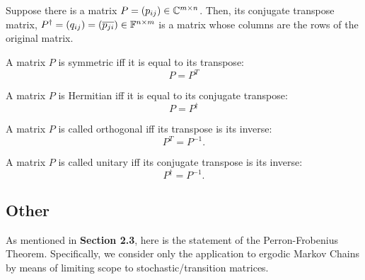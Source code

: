 \begin{definition}
Suppose there is a matrix $P = (p_{ij}) \in \mathbb{C}^{m\times n}$. Then, its conjugate transpose matrix, $P^{\dagger} = (q_{ij}) = (\overline{p_{ji}}) \in \mathbb{F}^{n\times m}$ is a matrix whose columns are the rows of the original matrix.
\end{definition}

\begin{definition}
A matrix $P$ is symmetric iff it is equal to its transpose:
$$ P = P^{T}$$
\end{definition}

\begin{definition}
A matrix $P$ is Hermitian iff it is equal to its conjugate transpose:
$$ P = P^{\dagger}$$
\end{definition}

\begin{definition}
A matrix $P$ is called orthogonal iff its transpose is its inverse:
$$ P^{T}=P^{-1}. $$
\end{definition}


\begin{definition}
A matrix $P$ is called unitary iff its conjugate transpose is its inverse:
$$ P^{\dagger}=P^{-1}. $$
\end{definition}


\subsection{Other}

As mentioned in \textbf{Section 2.3}, here is the statement of the Perron-Frobenius Theorem.
Specifically, we consider only the application to ergodic Markov Chains by means of limiting scope to stochastic/transition matrices.

